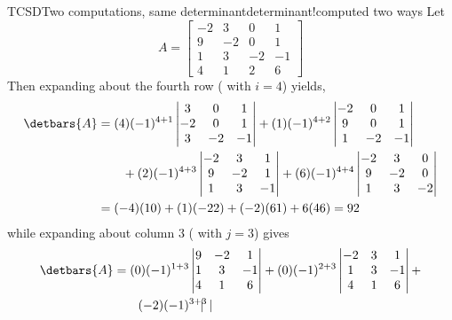 \begin{example}{TCSD}{Two computations, same determinant}{determinant!computed two ways}
Let
%
\begin{equation*}
A=
\begin{bmatrix}
-2 & 3 & 0 & 1\\
9 & -2 & 0 & 1\\
1 & 3 & -2 & -1\\
4 & 1 & 2 & 6
\end{bmatrix}
\end{equation*}
%
Then expanding about the fourth row ( with $i=4$) yields,
%
\begin{align*}
\detbars{A}
&=
(4)(-1)^{4+1}
\begin{vmatrix}
 3 & 0 & 1\\
 -2 & 0 & 1\\
 3 & -2 & -1
\end{vmatrix}
+(1)(-1)^{4+2}
\begin{vmatrix}
-2 &  0 & 1\\
9 &  0 & 1\\
1 &  -2 & -1
\end{vmatrix}\\
%
&\quad\quad+(2)(-1)^{4+3}
\begin{vmatrix}
-2 & 3 &  1\\
9 & -2 &  1\\
1 & 3  & -1
\end{vmatrix}
+(6)(-1)^{4+4}
\begin{vmatrix}
-2 & 3 & 0 \\
9 & -2 & 0 \\
1 & 3 & -2
\end{vmatrix}\\
&=
(-4)(10)+(1)(-22)+(-2)(61)+6(46)=92
\end{align*}
%
while expanding about column 3 ( with $j=3$) gives
%
\begin{align*}
\detbars{A}
&=
(0)(-1)^{1+3}
\begin{vmatrix}
9 & -2 & 1\\
1 & 3 & -1\\
4 & 1 & 6
\end{vmatrix}
+
(0)(-1)^{2+3}
\begin{vmatrix}
-2 & 3 & 1\\
1 & 3 & -1\\
4 & 1 & 6
\end{vmatrix}
+\\
%
&\quad\quad(-2)(-1)^{3+3}
\begin{vmatrix}

\end{vmatrix}
\end{align*}
\end{example}
